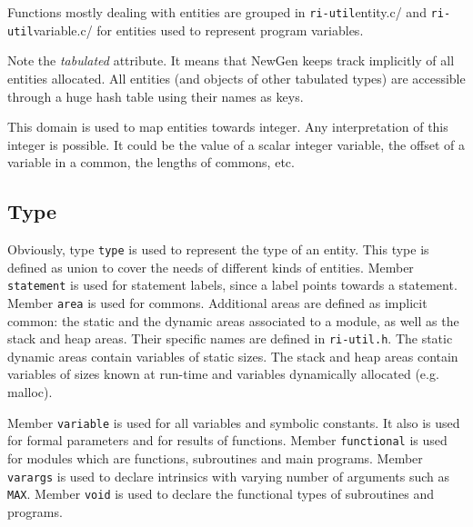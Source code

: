 \documentclass[a4paper]{article}
\begin{document}
Functions mostly dealing with entities are grouped in
\verb/ri-util/entity.c/ and \verb/ri-util/variable.c/ for entities used
to represent program variables.

Note the \emph{tabulated} attribute. It means that NewGen keeps track
implicitly of all entities allocated. All entities (and objects of other
tabulated types) are accessible through a huge hash table using their
names as keys.


This domain is used to map entities towards integer. Any interpretation
of this integer is possible. It could be the value of a scalar integer
variable, the offset of a variable in a common, the lengths of commons,
etc.

\subsection{Type}
\label{subsection-type}


Obviously, type \texttt{type} is used to represent the type of an
entity. This type is defined as union to cover the needs of different
kinds of entities. Member \texttt{statement} is used for statement
labels, since a label points towards a statement. Member
\texttt{area} is used for commons. Additional areas are
defined as implicit common: the static and the dynamic areas
associated to a module, as well as the stack and heap areas. Their
specific names are defined in \texttt{ri-util.h}. The static dynamic
areas contain variables of static sizes. The stack and heap areas
contain variables of sizes known at run-time and variables dynamically
allocated (e.g. malloc).

Member \texttt{variable} is used for all variables and symbolic constants. It
also is used for formal parameters and for results of functions. Member
\texttt{functional} is used for modules which are functions, subroutines and
main programs. Member \texttt{varargs} is used to declare intrinsics with
varying number of arguments such as \verb/MAX/. Member \texttt{void} is used
to declare the functional types of subroutines and programs.

\begin{comment}
Le domaine \verb/type/ repr�sente le type d'une entit�.  Le
sous-domaine \verb/statement/ est utilis� pour les labels
d'instruction.  Le sous-domaine \verb/area/ est utilis� pour les
commons et pour les deux zones statique et dynamique associ�e � chaque
module.  Le sous-domaine \verb/variable/ est utilis� pour toutes les
variables, y compris les param�tres formels et le r�sultat d'une
fonction Fortran.  Le sous-domaine \verb/functional/ est utilis� pour les
fonctions, pour les subroutines et pour le programme principal.  Le
sous-domaine \verb/void/ est utilis� pour le r�sultat d'une subroutine
ou d'un programme principal.
\end{comment}
\end{document}
